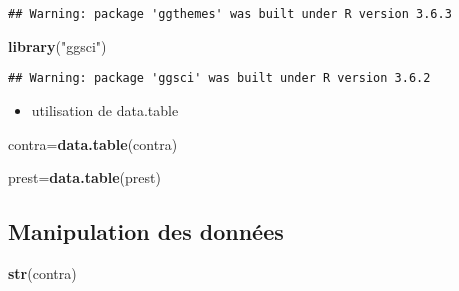 \documentclass[
]{article}
\newenvironment{Shaded}{\begin{snugshade}}{\end{snugshade}}
\newcommand{\KeywordTok}[1]{\textcolor[rgb]{0.13,0.29,0.53}{\textbf{#1}}}
\newcommand{\NormalTok}[1]{#1}
\newcommand{\StringTok}[1]{\textcolor[rgb]{0.31,0.60,0.02}{#1}}
\providecommand{\tightlist}{%
  \setlength{\itemsep}{0pt}\setlength{\parskip}{0pt}}
\begin{document}
\begin{verbatim}
## Warning: package 'ggthemes' was built under R version 3.6.3
\end{verbatim}

\begin{Shaded}
\begin{Highlighting}[]
\KeywordTok{library}\NormalTok{(}\StringTok{"ggsci"}\NormalTok{)}
\end{Highlighting}
\end{Shaded}

\begin{verbatim}
## Warning: package 'ggsci' was built under R version 3.6.2
\end{verbatim}

\begin{itemize}
\tightlist
\item
  utilisation de data.table
\end{itemize}

\begin{Shaded}
\begin{Highlighting}[]
\NormalTok{contra=}\KeywordTok{data.table}\NormalTok{(contra)}

\NormalTok{prest=}\KeywordTok{data.table}\NormalTok{(prest)}
\end{Highlighting}
\end{Shaded}

\hypertarget{manipulation-des-donnuxe9es}{%
\subsection{Manipulation des
données}\label{manipulation-des-donnuxe9es}}

\begin{Shaded}
\begin{Highlighting}[]
\KeywordTok{str}\NormalTok{(contra)}
\end{Highlighting}
\end{Shaded}
\end{document}
